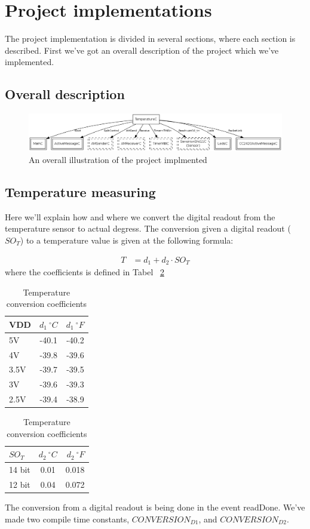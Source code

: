\section{Project implementations}

The project implementation is divided in several sections, where each section
is described. First we've got an overall description of the project which we've
implemented.

\subsection{Overall description}
\begin{figure}[htbp]
   \centering
   \includegraphics[width=17cm]{img/TemperatureAppC.png} 
   \caption{An overall illustration of the project implmented}
   \label{fig:overalloverview}
\end{figure}

\subsection{Temperature measuring}
Here we'll explain how and where we convert the digital readout from the
temperature sensor to actual degress. The conversion given a digital readout
($SO_{T}$) to a temperature value is given at the following
formula\cite{temperature}:

\begin{align*}
	T &= d_{1} + d_{2} \cdot SO_{T}
\end{align*}
where the coefficients is defined in Tabel ~\ref{table:temperature}
\begin{table}[ht]
\centering
\begin{tabular}{ | l | c | r | }
	\hline
	VDD & $d_{1} \ ^{\circ}  C$ & $d_{1} \ ^{\circ}  F$ \\
	\hline \hline
	5V & -40.1 & -40.2 \\
	\hline
	4V & -39.8 & -39.6 \\
	\hline
	3.5V & -39.7 & -39.5 \\
	\hline
	3V & -39.6 & -39.3 \\
	\hline
	2.5V & -39.4 & -38.9 \\
	\hline
\end{tabular}
\begin{tabular}{ | l | c | r | }
	\hline
	$SO_{T}$ & $d_{2}  \ ^{\circ}C$ & $d_{2} \ ^{\circ} F$ \\
	\hline \hline
	14 bit & 0.01 & 0.018 \\
	\hline
	12 bit & 0.04 & 0.072\\
	\hline
\end{tabular}
\caption{Temperature conversion coefficients}
\label{table:temperature}
\end{table}
The conversion from a digital readout is being done in the event readDone.
We've made two compile time constants, $CONVERSION_{D1}$, and
$CONVERSION_{D2}$.

